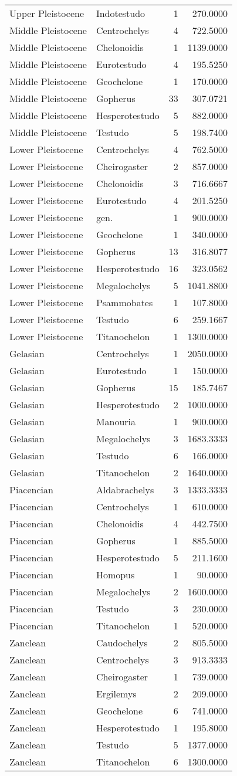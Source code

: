 \begin{longtable}[]{@{}llrr@{}}
	Upper Pleistocene & Indotestudo & 1 & 270.0000\tabularnewline
	Middle Pleistocene & Centrochelys & 4 & 722.5000\tabularnewline
	Middle Pleistocene & Chelonoidis & 1 & 1139.0000\tabularnewline
	Middle Pleistocene & Eurotestudo & 4 & 195.5250\tabularnewline
	Middle Pleistocene & Geochelone & 1 & 170.0000\tabularnewline
	Middle Pleistocene & Gopherus & 33 & 307.0721\tabularnewline
	Middle Pleistocene & Hesperotestudo & 5 & 882.0000\tabularnewline
	Middle Pleistocene & Testudo & 5 & 198.7400\tabularnewline
	Lower Pleistocene & Centrochelys & 4 & 762.5000\tabularnewline
	Lower Pleistocene & Cheirogaster & 2 & 857.0000\tabularnewline
	Lower Pleistocene & Chelonoidis & 3 & 716.6667\tabularnewline
	Lower Pleistocene & Eurotestudo & 4 & 201.5250\tabularnewline
	Lower Pleistocene & gen. & 1 & 900.0000\tabularnewline
	Lower Pleistocene & Geochelone & 1 & 340.0000\tabularnewline
	Lower Pleistocene & Gopherus & 13 & 316.8077\tabularnewline
	Lower Pleistocene & Hesperotestudo & 16 & 323.0562\tabularnewline
	Lower Pleistocene & Megalochelys & 5 & 1041.8800\tabularnewline
	Lower Pleistocene & Psammobates & 1 & 107.8000\tabularnewline
	Lower Pleistocene & Testudo & 6 & 259.1667\tabularnewline
	Lower Pleistocene & Titanochelon & 1 & 1300.0000\tabularnewline
	Gelasian & Centrochelys & 1 & 2050.0000\tabularnewline
	Gelasian & Eurotestudo & 1 & 150.0000\tabularnewline
	Gelasian & Gopherus & 15 & 185.7467\tabularnewline
	Gelasian & Hesperotestudo & 2 & 1000.0000\tabularnewline
	Gelasian & Manouria & 1 & 900.0000\tabularnewline
	Gelasian & Megalochelys & 3 & 1683.3333\tabularnewline
	Gelasian & Testudo & 6 & 166.0000\tabularnewline
	Gelasian & Titanochelon & 2 & 1640.0000\tabularnewline
	Piacencian & Aldabrachelys & 3 & 1333.3333\tabularnewline
	Piacencian & Centrochelys & 1 & 610.0000\tabularnewline
	Piacencian & Chelonoidis & 4 & 442.7500\tabularnewline
	Piacencian & Gopherus & 1 & 885.5000\tabularnewline
	Piacencian & Hesperotestudo & 5 & 211.1600\tabularnewline
	Piacencian & Homopus & 1 & 90.0000\tabularnewline
	Piacencian & Megalochelys & 2 & 1600.0000\tabularnewline
	Piacencian & Testudo & 3 & 230.0000\tabularnewline
	Piacencian & Titanochelon & 1 & 520.0000\tabularnewline
	Zanclean & Caudochelys & 2 & 805.5000\tabularnewline
	Zanclean & Centrochelys & 3 & 913.3333\tabularnewline
	Zanclean & Cheirogaster & 1 & 739.0000\tabularnewline
	Zanclean & Ergilemys & 2 & 209.0000\tabularnewline
	Zanclean & Geochelone & 6 & 741.0000\tabularnewline
	Zanclean & Hesperotestudo & 1 & 195.8000\tabularnewline
	Zanclean & Testudo & 5 & 1377.0000\tabularnewline
	Zanclean & Titanochelon & 6 & 1300.0000\tabularnewline

\end{longtable}
